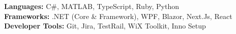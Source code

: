 \textbf{Languages:} C\#, MATLAB, TypeScript, Ruby, Python\\
\textbf{Frameworks:} .NET (Core \& Framework), WPF, Blazor, Next.Js, React \\
\textbf{Developer Tools:} Git, Jira, TestRail, WiX Toolkit, Inno Setup 